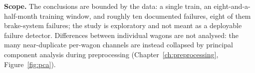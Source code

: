 \textbf{Scope.} The conclusions are bounded by the data: a single train, an eight-and-a-half-month
training window, and roughly ten documented failures, eight of them brake-system failures; the
study is exploratory and not meant as a deployable failure detector. Differences between individual
wagons are not analysed: the many near-duplicate per-wagon channels are instead collapsed by
principal component analysis during preprocessing (Chapter~\ref{ch:preprocessing},
Figure~\ref{fig:pca}).